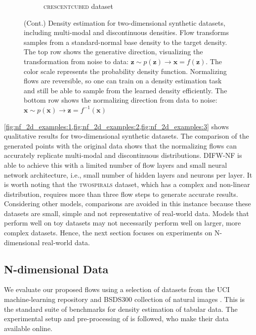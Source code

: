 \begin{figure}[!htb]
\begin{center}
\begin{subfigure}{0.48\linewidth}
      \caption{\textsc{crescentcubed} dataset}
      \label{fig:NF_2D_CRESCENTCUBED}
    \end{subfigure}
    \caption{(Cont.) Density estimation for two-dimensional synthetic datasets, including multi-modal and discontinuous densities. Flow transforms samples from a standard-normal base density to the target density. The top row shows the generative direction, visualizing the transformation from noise to data: $\mathbf{z} \sim p(\mathbf{z}) \rightarrow \mathbf{x} = f(\mathbf{z})$. The color scale represents the probability density function. Normalizing flows are reversible, so one can train on a density estimation task and still be able to sample from the learned density efficiently. The bottom row shows the normalizing direction from data to noise: $\mathbf{x} \sim p(\mathbf{x}) \rightarrow \mathbf{z} = f^{-1}(\mathbf{x})$}
    \label{fig:nf_2d_examples:3}
  \end{center}
\end{figure}

\cref{fig:nf_2d_examples:1,fig:nf_2d_examples:2,fig:nf_2d_examples:3} shows qualitative results for two-dimensional synthetic datasets. The comparison of the generated points with the original data shows that the normalizing flows can accurately replicate multi-modal and discontinuous distributions. DIFW-NF is able to achieve this with a limited number of flow layers and small neural network architecture, i.e., small number of hidden layers and neurons per layer. 
It is worth noting that the \textsc{twospirals} dataset, which has a complex and non-linear distribution, requires more than three flow steps to generate accurate results. Considering other models, comparisons are avoided in this instance because these datasets are small, simple and not representative of real-world data. Models that perform well on toy datasets may not necessarily perform well on larger, more complex datasets. Hence, the next section focuses on experiments on N-dimensional real-world data. 

\subsection{N-dimensional Data}

We evaluate our proposed flows using a selection of datasets from the UCI machine-learning
repository \cite{asuncion2007uci} and BSDS300 collection of natural images \cite{martin2001database}. This is the standard suite of benchmarks for density estimation of tabular data. The experimental setup and pre-processing of \cite{papamakarios2017masked} is followed, who make their data available online.

